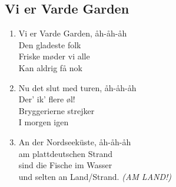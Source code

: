 \subsection*{Vi er Varde Garden}
\begin{enumerate}
\item Vi er Varde Garden, åh-åh-åh\\
  Den gladeste folk\\
  Friske møder vi alle\\
  Kan aldrig få nok
\item Nu det slut med turen, åh-åh-åh\\
  Der' ik' flere øl!\\
  Bryggerierne strejker\\
  I morgen igen
\item An der Nordseeküste, åh-åh-åh\\
  am plattdeutschen Strand\\
  sind die Fische im Wasser\\
  und selten an Land/Strand. \textit{(AM LAND!)}
\end{enumerate}
